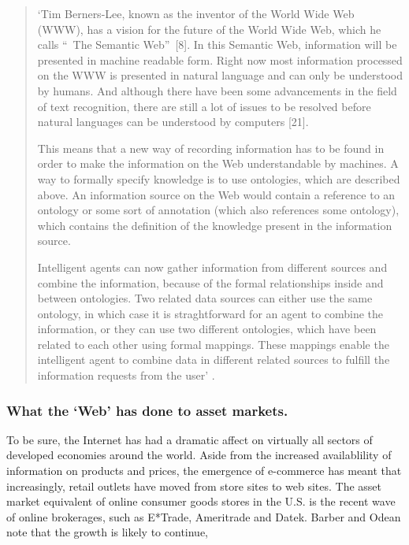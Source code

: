 \documentclass{ucthesis}
\begin{document}
\begin{quotation}
`Tim Berners-Lee, known as the inventor of the World Wide Web (WWW), has a
vision for the future of the World Wide Web, which he calls
\textquotedblleft\ The Semantic Web\textquotedblright\ [8]. In this Semantic
Web, information will be presented in machine readable form. Right now most
information processed on the WWW is presented in natural language and can
only be understood by humans. And although there have been some advancements
in the field of text recognition, there are still a lot of issues to be
resolved before natural languages can be understood by computers [21].

This means that a new way of recording information has to be found in order
to make the information on the Web understandable by machines. A way to
formally specify knowledge is to use ontologies, which are described above.
An information source on the Web would contain a reference to an ontology or
some sort of annotation (which also references some ontology), which
contains the definition of the knowledge present in the information source.

Intelligent agents can now gather information from different sources and
combine the information, because of the formal relationships inside and
between ontologies. Two related data sources can either use the same
ontology, in which case it is straghtforward for an agent to combine the
information, or they can use two different ontologies, which have been
related to each other using formal mappings. These mappings enable the
intelligent agent to combine data in different related sources to fulfill
the information requests from the user' \cite[pp. 9]{de Bruijn 2003}.
\end{quotation}

\subsubsection{What the `Web' has done to asset markets.}

To be sure, the Internet has had a dramatic affect on virtually all sectors
of developed economies around the world. Aside from the increased
availablility of information on products and prices, the emergence of
e-commerce has meant that increasingly, retail outlets have moved from store
sites to web sites. The asset market equivalent of online consumer goods
stores in the U.S. is the recent wave of online brokerages, such as E*Trade,
Ameritrade and Datek. Barber and Odean note that the growth is likely to
continue,
\end{document}
